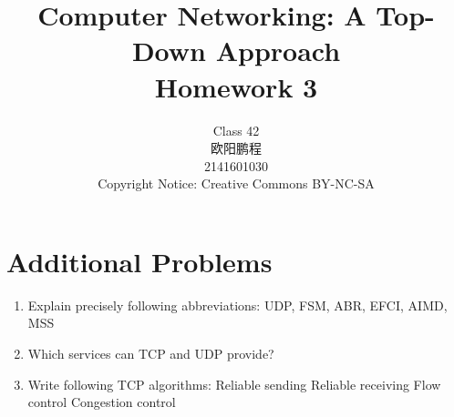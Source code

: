 \documentclass[]{article}
\title{Computer Networking: A Top-Down Approach \\ Homework 3}
\author{Class 42 \\ 欧阳鹏程 \\ 2141601030 \\ Copyright Notice: Creative Commons BY-NC-SA}
\begin{document}
\maketitle

\section{Additional Problems}
\begin{enumerate}
	\item Explain precisely following abbreviations:
	\subitem UDP, FSM, ABR, EFCI, AIMD, MSS
	
	
	\item Which services can TCP and UDP provide?
	
	
	\item Write following TCP algorithms:
	\subitem Reliable sending
	\subitem Reliable receiving
	\subitem Flow control
	\subitem Congestion control
	
\end{enumerate}
\end{document}
